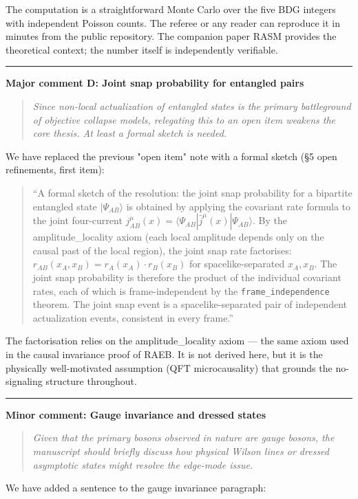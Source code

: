 \documentclass[11pt]{article}
\newcommand{\refereequote}[1]{%
  \begin{quote}\itshape\small #1\end{quote}}
\begin{document}
The computation is a straightforward Monte Carlo over the five BDG integers
with independent Poisson counts. The referee or any reader can reproduce it
in minutes from the public repository. The companion paper RASM provides
the theoretical context; the number itself is independently verifiable.

\bigskip\hrule\bigskip

\noindent\textbf{Major comment D: Joint snap probability for entangled pairs}

\refereequote{Since non-local actualization of entangled states is the primary
battleground of objective collapse models, relegating this to an open item
weakens the core thesis. At least a formal sketch is needed.}

We have replaced the previous "open item" note with a formal sketch
(\S5 open refinements, first item):

\begin{quote}
``A formal sketch of the resolution: the joint snap probability for a bipartite
entangled state $|\Psi_{AB}\rangle$ is obtained by applying the covariant rate
formula to the joint four-current $j^\mu_{AB}(x) = \langle \Psi_{AB}|
\hat{j}^\mu(x)|\Psi_{AB}\rangle$. By the amplitude\_locality axiom (each
local amplitude depends only on the causal past of the local region),
the joint snap rate factorises: $r_{AB}(x_A, x_B) = r_A(x_A) \cdot r_B(x_B)$
for spacelike-separated $x_A, x_B$. The joint snap probability is therefore
the product of the individual covariant rates, each of which is
frame-independent by the \texttt{frame\_independence} theorem. The joint
snap event is a spacelike-separated pair of independent actualization events,
consistent in every frame.''
\end{quote}

The factorisation relies on the amplitude\_locality axiom --- the same axiom
used in the causal invariance proof of RAEB. It is not derived here, but
it is the physically well-motivated assumption (QFT microcausality) that
grounds the no-signaling structure throughout.

\bigskip\hrule\bigskip

\noindent\textbf{Minor comment: Gauge invariance and dressed states}

\refereequote{Given that the primary bosons observed in nature are gauge
bosons, the manuscript should briefly discuss how physical Wilson lines or
dressed asymptotic states might resolve the edge-mode issue.}

We have added a sentence to the gauge invariance paragraph:
\end{document}
